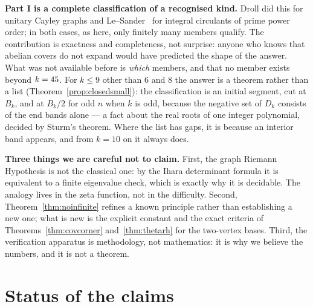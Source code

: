 \documentclass[11pt]{article}
\theoremstyle{definition}
\begin{document}
\textbf{Part I is a complete classification of a recognised kind.} Droll did
this for unitary Cayley graphs and Le--Sander~\cite{lesander} for integral
circulants of prime power order; in both cases, as here, only finitely many
members qualify. The contribution is exactness and completeness, not surprise:
anyone who knows that abelian covers do not expand would have predicted the
shape of the answer. What was not available before is \emph{which} members, and
that no member exists beyond $k=45$. For $k\le9$ other than $6$ and
$8$ the answer is a theorem rather than a list (Theorem~\ref{prop:closedsmall}):
the classification is an initial segment, cut at $B_k$, and at $B_k/2$ for odd
$n$ when $k$ is odd, because the negative set of $D_k$ consists of the end
bands alone --- a fact about the real roots of one integer polynomial, decided
by Sturm's theorem. Where the list has gaps, it is because an interior band
appears, and from $k=10$ on it always does.

\textbf{Three things we are careful not to claim.} First, the graph Riemann
Hypothesis is not the classical one: by the Ihara determinant formula it is
equivalent to a finite eigenvalue check, which is exactly why it is decidable.
The analogy lives in the zeta function, not in the difficulty. Second,
Theorem~\ref{thm:noinfinite} refines a known principle rather than establishing
a new one; what is new is the explicit constant and the exact criteria of
Theorems~\ref{thm:covcorner} and~\ref{thm:thetarh} for the two-vertex bases.
Third, the verification apparatus is methodology, not mathematics: it is why we
believe the numbers, and it is not a theorem.

\section{Status of the claims}
\end{document}
